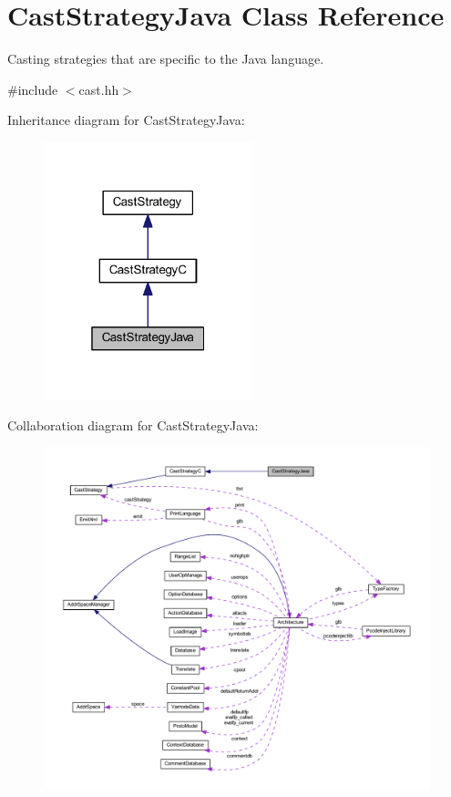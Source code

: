 \hypertarget{class_cast_strategy_java}{}\section{Cast\+Strategy\+Java Class Reference}
\label{class_cast_strategy_java}


Casting strategies that are specific to the Java language.  




{\ttfamily \#include $<$cast.\+hh$>$}



Inheritance diagram for Cast\+Strategy\+Java\+:
\nopagebreak
\begin{figure}[H]
\begin{center}
\leavevmode
\includegraphics[width=172pt]{class_cast_strategy_java__inherit__graph}
\end{center}
\end{figure}


Collaboration diagram for Cast\+Strategy\+Java\+:
\nopagebreak
\begin{figure}[H]
\begin{center}
\leavevmode
\includegraphics[width=350pt]{class_cast_strategy_java__coll__graph}
\end{center}
\end{figure}
